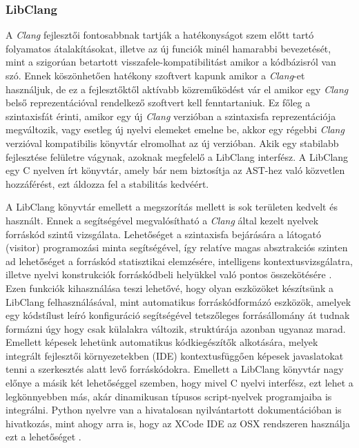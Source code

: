 \documentclass[a4paper,12pt]{report}
\begin{document}
\subsubsection{LibClang}
A \emph{Clang} fejlesztői fontosabbnak tartják a hatékonyságot szem előtt tartó folyamatos átalakításokat, illetve az új funciók minél hamarabbi bevezetését, mint a szigorúan betartott visszafele-kompatibilitást amikor a kódbázisról van szó. Ennek köszönhetően hatékony szoftvert kapunk amikor a \emph{Clang}-et használjuk, de ez a fejlesztőktől aktívabb közreműködést vár el amikor egy \emph{Clang} belső reprezentációval rendelkező szoftvert kell fenntartaniuk. Ez főleg a szintaxisfát érinti, amikor egy új \emph{Clang} verzióban a szintaxisfa reprezentációja megváltozik, vagy esetleg új nyelvi elemeket emelne be, akkor egy régebbi \emph{Clang} verzióval kompatibilis könyvtár elromolhat az új verzióban. Akik egy stabilabb fejlesztése felületre vágynak, azoknak megfelelő a LibClang interfész. A LibClang egy C nyelven írt könyvtár, amely bár nem biztosítja az AST-hez való közvetlen  hozzáférést, ezt áldozza fel a stabilitás kedvéért.

A LibClang könyvtár emellett a megszorítás mellett is sok területen kedvelt és használt. Ennek a segítségével megvalósítható a \emph{Clang} által kezelt nyelvek forráskód szintű vizsgálata. Lehetőséget a szintaxisfa bejárására a látogató (visitor) programozási minta segítségével, így relatíve magas absztrakciós szinten ad lehetőséget a forráskód statisztikai elemzésére, intelligens kontextusvizsgálatra, illetve nyelvi konstrukciók forráskódbeli helyükkel való pontos összekötésére \cite{libclangdocs}. Ezen funkciók kihasználása teszi lehetővé, hogy olyan eszközöket készítsünk a LibClang felhasználásával, mint automatikus forráskódformázó eszközök, amelyek egy kódstílust leíró konfiguráció segítségével tetszőleges forrásállomány át tudnak formázni úgy hogy csak külalakra változik, struktúrája azonban ugyanaz marad. Emellett képesek lehetünk automatikus kódkiegészítők alkotására, melyek integrált fejlesztői környezetekben (IDE) kontextusfüggően képesek javaslatokat tenni a szerkesztés alatt levő forráskódokra. Emellett a LibClang könyvtár nagy előnye a másik két lehetőséggel szemben, hogy mivel C nyelvi interfész, ezt lehet a legkönnyebben más, akár dinamikusan típusos script-nyelvek programjaiba is integrálni. Python nyelvre van a hivatalosan nyilvántartott dokumentációban is hivatkozás, mint ahogy arra is, hogy az XCode IDE az OSX rendszeren használja ezt a lehetőséget \cite{clangtooling}.
\end{document}

